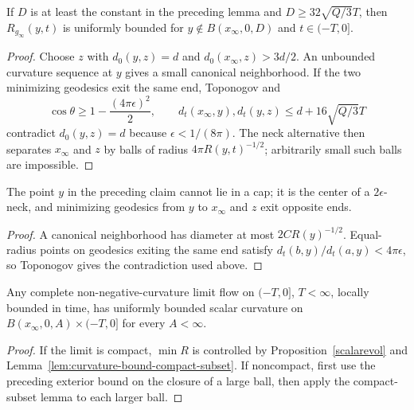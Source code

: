 \begin{claim}
\label{claim:curvature-bound-outside-large-ball}\label{outerbd}
If $D$ is at least the constant in the preceding lemma and
$D\ge32\sqrt{Q/3}T$, then $R_{g_\infty}(y,t)$ is uniformly bounded for
$y\notin B(x_\infty,0,D)$ and $t\in(-T,0]$.
\end{claim}
\begin{proof}
\sketch Choose $z$ with $d_0(y,z)=d$ and $d_0(x_\infty,z)>3d/2$. An
unbounded curvature sequence at $y$ gives a small canonical neighborhood.
If the two minimizing geodesics exit the same end, Toponogov and
$$\cos\theta\ge1-\frac{(4\pi\epsilon)^2}{2},\qquad
d_t(x_\infty,y),d_t(y,z)\le d+16\sqrt{Q/3}T$$
contradict $d_0(y,z)=d$ because $\epsilon<1/(8\pi)$. The neck alternative
then separates $x_\infty$ and $z$ by balls of radius
$4\pi R(y,t)^{-1/2}$; arbitrarily small such balls are impossible.\end{proof}

\begin{claim}
\label{claim:neck-center-opposite-ends}
The point $y$ in the preceding claim cannot lie in a cap; it is the center of
a $2\epsilon$-neck, and minimizing geodesics from $y$ to $x_\infty$ and $z$
exit opposite ends.
\end{claim}
\begin{proof}\sketch A canonical neighborhood has diameter at most
$2CR(y)^{-1/2}$. Equal-radius points on geodesics exiting the same end satisfy
$d_t(b,y)/d_t(a,y)<4\pi\epsilon$, so Toponogov gives the contradiction used
above.\end{proof}

\begin{corollary}
\label{cor:curvature-bound-near-basepoint}\label{ancientlimit}
Any complete non-negative-curvature limit flow on $(-T,0]$, $T<\infty$,
locally bounded in time, has uniformly bounded scalar curvature on
$B(x_\infty,0,A)\times(-T,0]$ for every $A<\infty$.
\end{corollary}
\begin{proof}
\sketch If the limit is compact, $\min R$ is controlled by
Proposition~\ref{scalarevol} and Lemma~\ref{lem:curvature-bound-compact-subset}.
If noncompact, first use the preceding exterior bound on the closure of a
large ball, then apply the compact-subset lemma to each larger ball.\end{proof}

